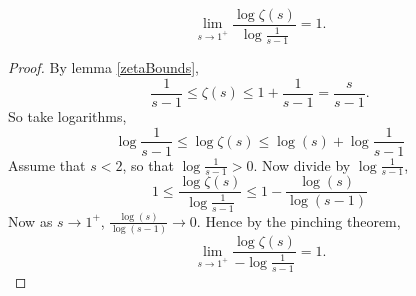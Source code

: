 \documentclass{unswmaths}
\begin{document}
    \begin{lemma}
    \label{zetaLimit}
        \begin{equation*}
            \lim_{s\rightarrow 1^+} \frac{\log\zeta(s)}{\log\frac{1}{s-1}} = 1.
        \end{equation*}
    \end{lemma}
    \begin{proof}
        By lemma \ref{zetaBounds}, 
        \begin{equation*}
            \frac{1}{s-1} \leq \zeta(s) \leq 1+\frac{1}{s-1} = \frac{s}{s-1}.
        \end{equation*}
        So take logarithms,
        \begin{equation*}
            \log\frac{1}{s-1} \leq \log\zeta(s) \leq \log(s) +\log\frac{1}{s-1}
        \end{equation*}
        Assume that $s < 2$, so that $\log\frac{1}{s-1} > 0$. Now divide by $\log\frac{1}{s-1}$,
        \begin{equation*}
            1 \leq \frac{\log\zeta(s)}{\log\frac{1}{s-1}} \leq 1 - \frac{\log(s)}{\log(s-1)}
        \end{equation*}
        Now as $s\rightarrow 1^+$, $\frac{\log(s)}{\log(s-1)}\rightarrow 0$.
        Hence by the pinching theorem,
        \begin{equation*}
            \lim_{s\rightarrow 1^+} \frac{\log\zeta(s)}{-\log\frac{1}{s-1}} = 1.
        \end{equation*}
    \end{proof}
    
\end{document}
